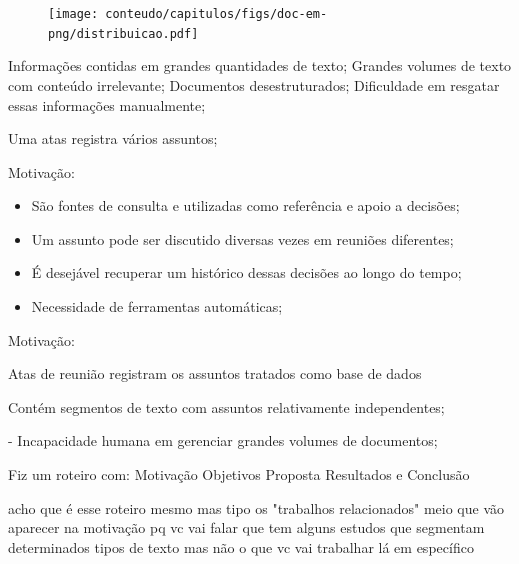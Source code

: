   \begin{center}
	\begin{figure}[h!]

		\texttt{[image: conteudo/capitulos/figs/doc-em-png/distribuicao.pdf]}

	\end{figure}
\end{center}


\label{fig:distribuicao-ata}

\caption{Distribuição de tópicos em uma ata real. Cada tópico é representado por uma região colorida. Abaixo estão os descritores identificados pela cor do respectivo tópico. Os nomes de pessoas foram ocultados por não expressarem significado nesse trabalho.}





Informações contidas em grandes quantidades de texto;
Grandes volumes de texto com conteúdo irrelevante;
Documentos desestruturados;
Dificuldade em resgatar essas informações manualmente;


	\item Uma atas registra vários assuntos;

Motivação:
\begin{itemize}
	\item São fontes de consulta e utilizadas como referência e apoio a decisões; 
	\item Um assunto pode ser discutido diversas vezes em reuniões diferentes;
	\item É desejável recuperar um histórico dessas decisões ao longo do tempo;
	\item Necessidade de ferramentas automáticas;
\end{itemize}

Motivação:


Atas de reunião registram os assuntos tratados  como base de dados


\item Contém segmentos de texto com assuntos relativamente independentes; 



- Incapacidade humana em gerenciar grandes volumes de documentos;








Fiz um roteiro com:
Motivação
Objetivos
Proposta
Resultados
e Conclusão


acho que é esse roteiro mesmo
mas tipo
os "trabalhos relacionados"
meio que vão aparecer na motivação
pq vc vai falar que tem alguns estudos que segmentam determinados tipos de texto
mas não o que vc vai trabalhar lá em específico






